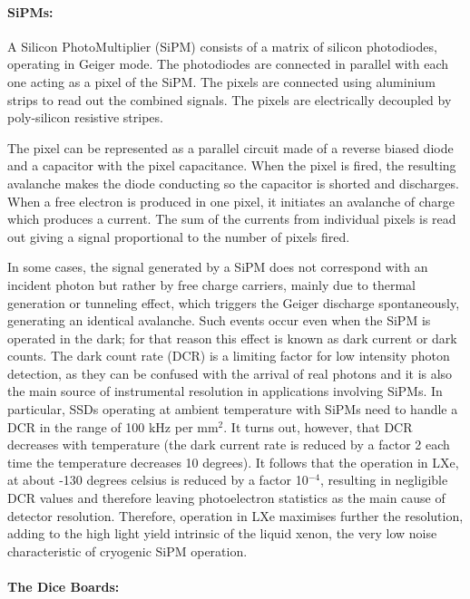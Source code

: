 \paragraph{SiPMs:}

A Silicon PhotoMultiplier (SiPM) consists of a matrix of silicon photodiodes, operating in Geiger mode. The photodiodes are connected in parallel with each one acting as a pixel of the SiPM. The pixels are connected using aluminium strips to read out the combined signals. The pixels are electrically decoupled by poly-silicon resistive stripes.

 The pixel can be represented as a parallel circuit made of a reverse biased diode and a capacitor with the pixel capacitance. When the pixel is fired, the resulting avalanche makes the diode conducting so the capacitor is shorted and discharges.
When a free electron is produced in one pixel, it initiates an avalanche of charge which produces a current. The sum of the currents from individual pixels is read out giving a signal proportional to the number of pixels fired.

In some cases, the signal generated by a SiPM does not correspond with an incident photon but rather by free charge carriers, mainly due to thermal generation or tunneling effect, which triggers the Geiger discharge spontaneously, generating an identical avalanche. Such events occur even when the SiPM is operated in the dark; for that reason this effect is known as dark current or dark counts. The dark count rate (DCR) is a limiting factor for low intensity photon detection, as they can be confused with the arrival of real photons and it is also the main source of instrumental resolution in applications involving SiPMs. In particular, SSDs operating at ambient temperature with SiPMs need to handle a DCR in the range of 100 kHz per mm$^2$. It turns out, however, that DCR decreases with temperature (the dark current rate is reduced by a factor 2 each time the temperature decreases 10 degrees). It follows that the operation in LXe, at about -130 degrees celsius is reduced by a factor 10$^{-4}$, resulting in negligible DCR values and therefore leaving photoelectron statistics as the main cause  of detector resolution. Therefore, operation in LXe maximises further the resolution, adding to the high light yield intrinsic of the liquid xenon, the very low noise characteristic of cryogenic SiPM operation. 

\paragraph{The Dice Boards:}
\label{sec.dc}

